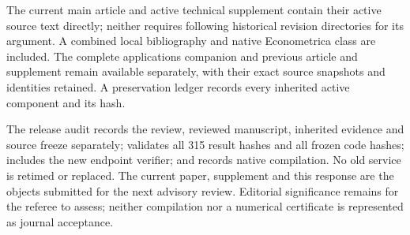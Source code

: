 \documentclass[
  11pt,
]{article}
\begin{document}
The current main article and active technical supplement contain their
active source text directly; neither requires following historical
revision directories for its argument. A combined local bibliography and
native Econometrica class are included. The complete applications
companion and previous article and supplement remain available
separately, with their exact source snapshots and identities retained. A
preservation ledger records every inherited active component and its
hash.

The release audit records the review, reviewed manuscript, inherited
evidence and source freeze separately; validates all 315 result hashes
and all frozen code hashes; includes the new endpoint verifier; and
records native compilation. No old service is retimed or replaced. The
current paper, supplement and this response are the objects submitted
for the next advisory review. Editorial significance remains for the
referee to assess; neither compilation nor a numerical certificate is
represented as journal acceptance.
\end{document}
